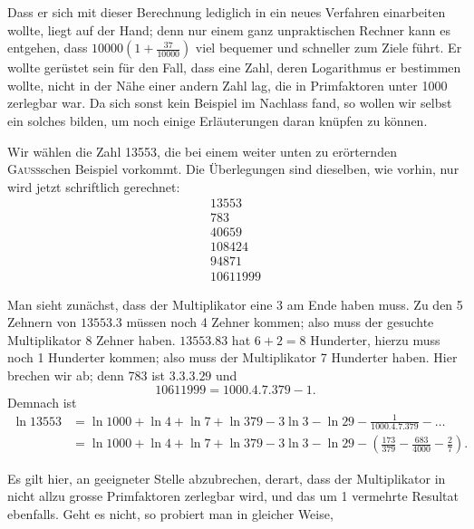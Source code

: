 \clearpage{}
\noindent Dass er sich mit dieser Berechnung lediglich in ein neues Verfahren einarbeiten wollte, liegt auf der Hand; denn nur einem ganz unpraktischen
Rechner kann es entgehen, dass $10000\left(1+\frac{37}{10000}\right)$ viel bequemer und schneller
zum Ziele führt. Er wollte gerüstet sein für den Fall, dass eine Zahl, deren
Logarithmus er bestimmen wollte, nicht in der Nähe einer andern Zahl lag,
die in Primfaktoren unter 1000 zerlegbar war. Da sich sonst kein Beispiel
im Nachlass fand, so wollen wir selbst ein solches bilden, um noch einige
Erläuterungen daran knüpfen zu können.

Wir wählen die Zahl 13553, die bei einem weiter unten zu erörternden
\textsc{Gauss}schen Beispiel vorkommt. Die Überlegungen sind dieselben, wie vorhin, nur wird jetzt schriftlich gerechnet:
\[
\begin{array}{r}
13553\\
783\\\hline
40659\\
108424\phantom{0}\\
94871\phantom{00}\\\hline
10611999
\end{array}
\]
\par\noindent\hspace*{\parindent}Man sieht zunächst, dass der Multiplikator eine 3 am Ende haben muss.
Zu den 5 Zehnern von $13553\mathord{.}3$ müssen noch 4 Zehner kommen; also muss
der gesuchte Multiplikator 8 Zehner haben. $13553\mathord{.}83$ hat $6+2=8$ Hunderter, hierzu muss noch 1 Hunderter kommen; also muss der Multiplikator
7 Hunderter haben. Hier brechen wir ab; denn 783 ist $3\mathord{.}3\mathord{.}3\mathord{.}29$ und
\[
10611999=1000\mathord{.}4\mathord{.}7\mathord{.}379-1.
\]
\noindent Demnach ist
\begingroup\small
\[
\begin{aligned}
\ln13553&=\ln1000+\ln4+\ln7+\ln379-3\ln3-\ln29-\frac{1}{1000\mathord{.}4\mathord{.}7\mathord{.}379}-\ldots\\
&=\ln1000+\ln4+\ln7+\ln379-3\ln3-\ln29-\left(\frac{173}{379}-\frac{683}{4000}-\frac{2}{7}\right).
\end{aligned}
\]
\endgroup
\par\noindent\hspace*{\parindent}Es gilt hier, an geeigneter Stelle abzubrechen, derart, dass der Multiplikator in nicht allzu grosse Primfaktoren zerlegbar wird, und das um 1 vermehrte Resultat ebenfalls. Geht es nicht, so probiert man in gleicher Weise,
